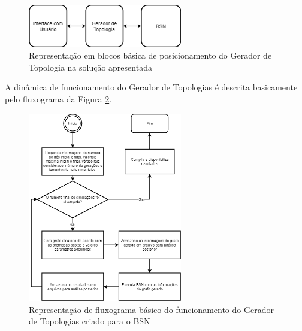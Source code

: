 \begin{figure} [ht]%
	\centering
	\includegraphics[width=0.6\textwidth]{./figuras/Gerador_topologia_blocos.png}
	\caption[Diagrama em blocos do Gerador de Topologias]{Representação em blocos básica de posicionamento do Gerador de Topologia na solução apresentada}
	\label{fig_gerador_topologia}
\end{figure}

 A dinâmica de funcionamento do Gerador de Topologias é descrita basicamente pelo fluxograma da Figura \ref{fig_prog_simula}.


\begin{figure} [ht]%
	\centering
	\includegraphics[width=0.6\textwidth]{./figuras/programa-simulacao.png}
	\caption[Fluxograma do Gerador de Topologias]{Representação de fluxograma básico do funcionamento do Gerador de Topologias criado para o BSN}
	\label{fig_prog_simula}
\end{figure}

